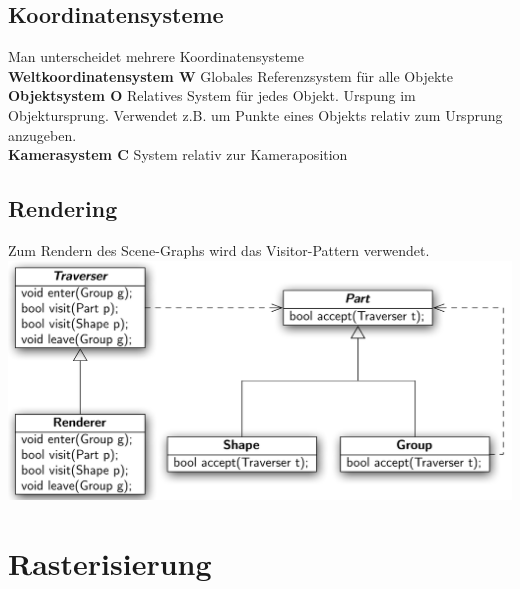 \documentclass[12pt]{article}
\begin{document}
	\subsection{Koordinatensysteme}
	Man unterscheidet mehrere Koordinatensysteme\\
	\textbf{Weltkoordinatensystem $\mathbf{W}$} Globales Referenzsystem für alle Objekte\\
	\textbf{Objektsystem $\mathbf{O}$} Relatives System für jedes Objekt. Urspung im Objektursprung. Verwendet z.B. um Punkte eines Objekts relativ zum Ursprung anzugeben.\\
	\textbf{Kamerasystem $\mathbf{C}$} System relativ zur Kameraposition

	\subsection{Rendering}
	Zum Rendern des Scene-Graphs wird das Visitor-Pattern verwendet.\\
	\includegraphics[width=\linewidth]{figures/visitor-pattern.png}

	\section{Rasterisierung}


\end{document}
